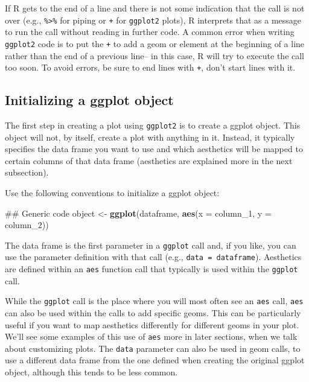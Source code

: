 \documentclass[]{book}
\makeatletter
\newenvironment{Shaded}{\begin{snugshade}}{\end{snugshade}}
\newcommand{\KeywordTok}[1]{\textcolor[rgb]{0.13,0.29,0.53}{\textbf{{#1}}}}
\newcommand{\DataTypeTok}[1]{\textcolor[rgb]{0.13,0.29,0.53}{{#1}}}
\newcommand{\StringTok}[1]{\textcolor[rgb]{0.31,0.60,0.02}{{#1}}}
\newcommand{\NormalTok}[1]{{#1}}
\newenvironment{kframe}{%
\medskip{}
\setlength{\fboxsep}{.8em}
 \def\at@end@of@kframe{}%
 \ifinner\ifhmode%
  \def\at@end@of@kframe{\end{minipage}}%
  \begin{minipage}{\columnwidth}%
 \fi\fi%
 \def\FrameCommand##1{\hskip\@totalleftmargin \hskip-\fboxsep
 \colorbox{shadecolor}{##1}\hskip-\fboxsep
     \hskip-\linewidth \hskip-\@totalleftmargin \hskip\columnwidth}%
 \MakeFramed {\advance\hsize-\width
   \@totalleftmargin\z@ \linewidth\hsize
   \@setminipage}}%
 {\par\unskip\endMakeFramed%
 \at@end@of@kframe}
\renewenvironment{Shaded}{\begin{kframe}}{\end{kframe}}
\newenvironment{rmdblock}[1]
  {
  \begin{itemize}
  \renewcommand{\labelitemi}{
    \raisebox{-.7\height}[0pt][0pt]{
      {\setkeys{Gin}{width=3em,keepaspectratio}\texttt{[image: images/\#1]}}
    }
  }
  \setlength{\fboxsep}{1em}
  \begin{kframe}
  \item
  }
  {
  \end{kframe}
  \end{itemize}
  }
\newenvironment{rmdnote}
  {\begin{rmdblock}{note}}
  {\end{rmdblock}}
\newenvironment{rmdwarning}
  {\begin{rmdblock}{warning}}
  {\end{rmdblock}}
\makeatother
\begin{document}
\begin{rmdwarning}
If R gets to the end of a line and there is not some indication that the
call is not over (e.g., \texttt{\%\textgreater{}\%} for piping or
\texttt{+} for \texttt{ggplot2} plots), R interprets that as a message
to run the call without reading in further code. A common error when
writing \texttt{ggplot2} code is to put the \texttt{+} to add a geom or
element at the beginning of a line rather than the end of a previous
line-- in this case, R will try to execute the call too soon. To avoid
errors, be sure to end lines with \texttt{+}, don't start lines with it.
\end{rmdwarning}

\subsection{Initializing a ggplot
object}\label{initializing-a-ggplot-object}

The first step in creating a plot using \texttt{ggplot2} is to create a
ggplot object. This object will not, by itself, create a plot with
anything in it. Instead, it typically specifies the data frame you want
to use and which aesthetics will be mapped to certain columns of that
data frame (aesthetics are explained more in the next subsection).

Use the following conventions to initialize a ggplot object:

\begin{Shaded}
\begin{Highlighting}[]
\NormalTok{## Generic code}
\NormalTok{object <-}\StringTok{ }\KeywordTok{ggplot}\NormalTok{(dataframe, }\KeywordTok{aes}\NormalTok{(}\DataTypeTok{x =} \NormalTok{column_1, }\DataTypeTok{y =} \NormalTok{column_2))}
\end{Highlighting}
\end{Shaded}

The data frame is the first parameter in a \texttt{ggplot} call and, if
you like, you can use the parameter definition with that call (e.g.,
\texttt{data\ =\ dataframe}). Aesthetics are defined within an
\texttt{aes} function call that typically is used within the
\texttt{ggplot} call.

\begin{rmdnote}
While the \texttt{ggplot} call is the place where you will most often
see an \texttt{aes} call, \texttt{aes} can also be used within the calls
to add specific geoms. This can be particularly useful if you want to
map aesthetics differently for different geoms in your plot. We'll see
some examples of this use of \texttt{aes} more in later sections, when
we talk about customizing plots. The \texttt{data} parameter can also be
used in geom calls, to use a different data frame from the one defined
when creating the original ggplot object, although this tends to be less
common.
\end{rmdnote}
\end{document}
